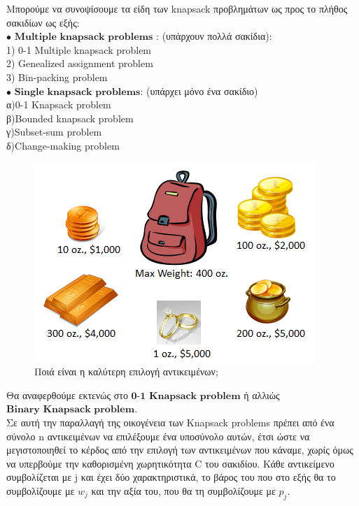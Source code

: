 \documentclass[12pt]{article}
\begin{document}
Μπορούμε να συνοψίσουμε τα είδη των knapsack προβλημάτων ως προς το πλήθος σακιδίων ως εξής: \\
 \(\bullet\) \(\textbf{Multiple knapsack problems}\) : (υπάρχουν πολλά σακίδια): \\
 1) 0-1 Multiple knapsack problem \\
 2) Genealized assignment problem \\
 3) Bin-packing problem \\
 \(\bullet\) \(\textbf{Single knapsack problems}\): (υπάρχει μόνο ένα σακίδιο) \\
 α)0-1 Knapsack problem \\
 β)Bounded   knapsack   problem \\
 γ)Subset-sum   problem \\
 δ)Change-making problem \\

\begin{figure}
	\centering
	\includegraphics[scale=0.7]{./knapsack_problem.png}
	\caption{Ποιά είναι η καλύτερη επιλογή αντικειμένων;}
\end{figure}

Θα αναφερθούμε εκτενώς στο \(\textbf{0-1 Knapsack problem}\)  ή αλλιώς \(\textbf{Binary Knapsack problem}\). \\

Σε αυτή την παραλλαγή της οικογένεια των Knapsack problems πρέπει από ένα σύνολο n αντικειμένων να επιλέξουμε ένα υποσύνολο αυτών, έτσι ώστε να μεγιστοποιηθεί το κέρδος από την επιλογή των αντικειμένων που κάναμε, χωρίς όμως να υπερβούμε την καθορισμένη χωρητικότητα C του σακιδίου. Κάθε αντικείμενο συμβολίζεται με j και έχει δύο χαρακτηριστικά, το βάρος του που στο εξής θα το συμβολίζουμε με \(w_{j}\) και την αξία του, που θα τη συμβολίζουμε με \(p_{j}\). \\
\end{document}
